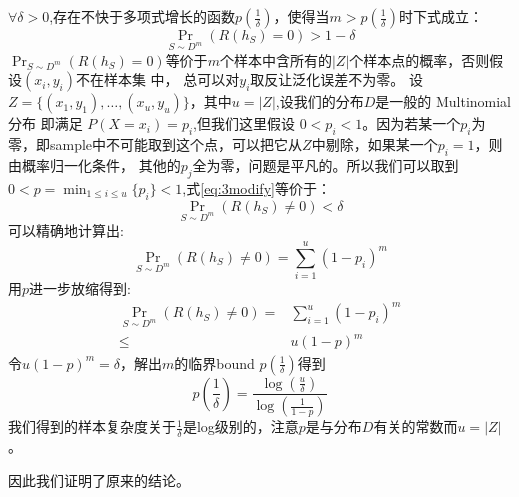 \documentclass{article}
\begin{document}
$\forall \delta >0$,存在不快于多项式增长的函数$p(\frac{1}{\delta})$，使得当$m>p(\frac{1}{\delta})$时下式成立： 
\begin{equation}\label{eq:3modify}
\Pr_{S\sim D^m}(R(h_S)=0)>1-\delta
\end{equation}
$\Pr_{S\sim D^m}(R(h_S)=0)$等价于$m$个样本中含所有的$|Z|$个样本点的概率，否则假设$(x_i,y_i)$不在样本集 中，
总可以对$y_i$取反让泛化误差不为零。
设$Z=\{(x_1,y_1),\dots,(x_u,y_u)\}$，其中$u=|Z|$,设我们的分布$D$是一般的 Multinomial 分布 即满足 $P(X=x_i)=p_i$,但我们这里假设
$0<p_i<1$。因为若某一个$p_i$为零，即sample中不可能取到这个点，可以把它从$Z$中剔除，如果某一个$p_i=1$，则由概率归一化条件，
其他的$p_j$全为零，问题是平凡的。所以我们可以取到$0<p=\min_{1\leq i\leq u}\{p_i\}<1$,式\eqref{eq:3modify}等价于：
\begin{equation}
\Pr_{S\sim D^m}(R(h_S)\neq 0)<\delta
\end{equation}
可以精确地计算出:
\begin{equation}
\Pr_{S\sim D^m}(R(h_S)\neq 0)=\sum_{i=1}^u (1-p_i)^m 
\end{equation}
用$p$进一步放缩得到:
\begin{align}
\Pr_{S\sim D^m}(R(h_S)\neq 0) =& \sum_{i=1}^u (1-p_i)^m  \nonumber\\
\leq & u(1-p)^m
\end{align}
令$u(1-p)^m=\delta$，解出$m$的临界bound $p(\frac{1}{\delta})$得到
\begin{equation}
p(\frac{1}{\delta})=\frac{\log(\frac{u}{\delta})}{\log(\frac{1}{1-p})}
\end{equation}
我们得到的样本复杂度关于$\frac{1}{\delta}$是log级别的，注意$p$是与分布$D$有关的常数而$u=|Z|$。

因此我们证明了原来的结论。
\end{document}
